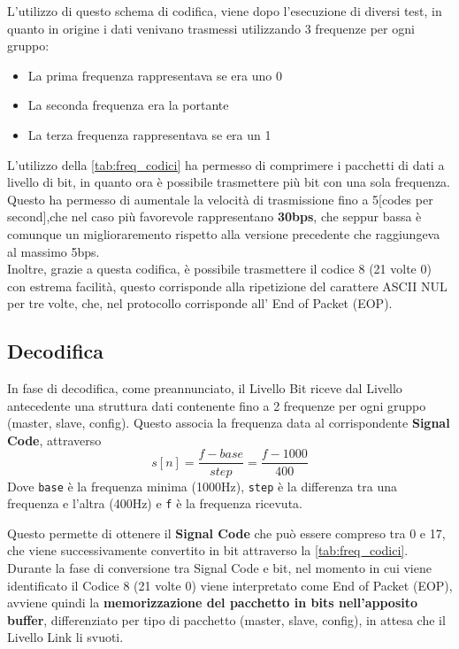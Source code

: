 L'utilizzo di questo schema di codifica, viene dopo l'esecuzione di diversi test, in quanto in origine i dati venivano trasmessi utilizzando 3 frequenze per ogni gruppo:
\begin{itemize}
\item La prima frequenza rappresentava se era uno 0
\item La seconda frequenza era la portante
\item La terza frequenza rappresentava se era un 1
\end{itemize}
L'utilizzo della \autoref{tab:freq_codici} ha permesso di comprimere i pacchetti di dati a livello di bit, in quanto ora è possibile trasmettere più bit
 con una sola frequenza.\\
Questo ha permesso di aumentale la velocità di trasmissione fino a 5[codes per second],che nel caso più favorevole rappresentano \textbf{30bps}, 
che seppur bassa è comunque un miglioraremento rispetto alla versione precedente che raggiungeva al massimo 5bps.\\
Inoltre, grazie a questa codifica, è possibile trasmettere il codice 8 (21 volte 0) 
con estrema facilità, questo corrisponde alla ripetizione del carattere ASCII NUL per tre volte, che, nel protocollo corrisponde all' End of Packet (EOP).\\

\subsection{Decodifica}
In fase di decodifica, come preannunciato, il Livello Bit riceve dal Livello antecedente una struttura dati contenente fino a 2 frequenze per ogni gruppo (master, slave, config).
Questo associa la frequenza data al corrispondente \textbf{Signal Code}, attraverso
\begin{equation}
s[n] = \frac{f-base}{step} = \frac{f-1000}{400}
\end{equation}
Dove \texttt{base} è la frequenza minima (1000Hz), \texttt{step} è la differenza tra una frequenza e l'altra (400Hz) e \texttt{f} è la frequenza ricevuta.

Questo permette di ottenere il \textbf{Signal Code} che può essere compreso tra 0 e 17, che viene successivamente convertito in bit attraverso
la \autoref{tab:freq_codici}.\\
Durante la fase di conversione tra Signal Code e bit, nel momento in cui viene identificato il Codice 8 (21 volte 0) viene interpretato come End of Packet (EOP),
avviene quindi la \textbf{memorizzazione del pacchetto in bits nell'apposito buffer}, differenziato per tipo di pacchetto (master, slave, config), 
in attesa che il Livello Link li svuoti.\\

